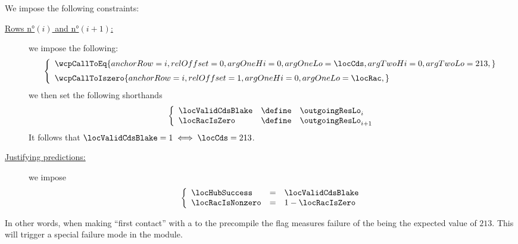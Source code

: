 We impose the following constraints:
\begin{description}
	\item[\underline{Rows n°$(i)$ and n°$(i + 1)$:}]
		we impose the following:
		\[
			\left\{ \begin{array}{l}
				\wcpCallToEq {
					anchorRow = i       ,
					relOffset = 0       ,
					argOneHi  = 0       ,
					argOneLo  = \locCds ,
					argTwoHi  = 0       ,
					argTwoLo  = 213     ,
				}
				\vspace{2mm} \\
				\wcpCallToIszero {
					anchorRow = i       ,
					relOffset = 1       ,
					argOneHi  = 0       ,
					argOneLo  = \locRac ,
				}
				\\
			\end{array} \right.
		\]
		we then set the following shorthands
		\[
			\left\{ \begin{array}{lcl}
				\locValidCdsBlake & \define & \outgoingResLo  _{i    } \\
				\locRacIsZero     & \define & \outgoingResLo  _{i + 1} \\
			\end{array} \right.
		\]
		It follows that $\locValidCdsBlake = 1 \iff \locCds = 213$.
	\item[\underline{Justifying \hubMod{} predictions:}]
		we impose
		\[
			\left\{ \begin{array}{lcl}
				\locHubSuccess   & = & \locValidCdsBlake \\
				\locRacIsNonzero & = & 1 - \locRacIsZero \\
			\end{array} \right.
		\]
\end{description}
In other words, when making ``first contact'' with a  to the  precompile the
\locValidCdsBlake{} flag measures failure of the \cds{} being the expected value of $213$. This will trigger a special failure mode in the \hubMod{} module. 
